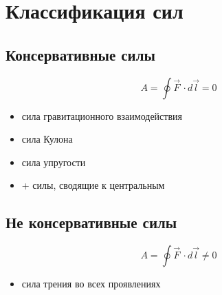 \documentclass[11pt]{article}
\begin{document}
\section{Классификация сил}

\subsection*{Консервативные силы}
\begin{definition}
    \[ A = \oint \vec{F}\, \cdot d\vec{l} = 0 \]
    \begin{itemize}
        \item сила гравитационного взаимодействия
        \item сила Кулона
        \item сила упругости
        \item + силы, сводящие к центральным
    \end{itemize}
\end{definition}

\subsection*{Не консервативные силы}

\begin{definition}
   \[ A = \oint \vec{F}\, \cdot d\vec{l} \neq 0 \]
   \begin{itemize}
    \item сила трения во всех проявлениях
   \end{itemize}
\end{definition}
\end{document}
